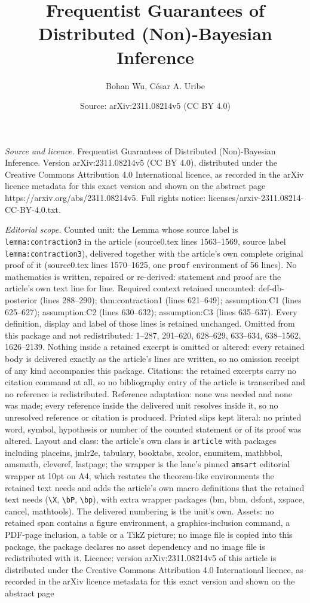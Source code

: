 \documentclass[10pt,a4paper]{amsart}
\title[Frequentist Guarantees of Distributed (Non)-Bayesian Inferen]{Frequentist Guarantees of Distributed (Non)-Bayesian Inference}
\author{Bohan Wu, C\'esar A. Uribe}
\date{Source: arXiv:2311.08214v5 (CC BY 4.0)}
\begin{document}
\maketitle

\noindent\emph{Source and licence.} Frequentist Guarantees of Distributed (Non)-Bayesian Inference. Version arXiv:2311.08214v5 (CC BY 4.0), distributed under the Creative Commons Attribution 4.0 International licence, as recorded in the arXiv licence metadata for this exact version and shown on the abstract page https://arxiv.org/abs/2311.08214v5. Full rights notice: licenses/arxiv-2311.08214-CC-BY-4.0.txt.\par\smallskip

\noindent\textit{Editorial scope.} Counted unit: the Lemma whose source label is \texttt{lemma:contraction3} in the article (source0.tex lines 1563--1569, source label \texttt{lemma:contraction3}), delivered together with the article's own complete original proof of it (source0.tex lines 1570--1625, one \texttt{proof} environment of 56 lines). No mathematics is written, repaired or re-derived: statement and proof are the article's own text line for line. Required context retained uncounted: def-db-posterior (lines 288--290); thm:contraction1 (lines 621--649); assumption:C1 (lines 625--627); assumption:C2 (lines 630--632); assumption:C3 (lines 635--637). Every definition, display and label of those lines is retained unchanged. Omitted from this package and not redistributed: 1--287, 291--620, 628--629, 633--634, 638--1562, 1626--2139. Nothing inside a retained excerpt is omitted or altered: every retained body is delivered exactly as the article's lines are written, so no omission receipt of any kind accompanies this package. Citations: the retained excerpts carry no citation command at all, so no bibliography entry of the article is transcribed and no reference is redistributed. Reference adaptation: none was needed and none was made; every reference inside the delivered unit resolves inside it, so no unresolved reference or citation is produced. Printed slips kept literal: no printed word, symbol, hypothesis or number of the counted statement or of its proof was altered. Layout and class: the article's own class is \texttt{article} with packages including placeins, jmlr2e, tabulary, booktabs, xcolor, enumitem, mathbbol, amsmath, cleveref, lastpage; the wrapper is the lane's pinned \texttt{amsart} editorial wrapper at 10pt on A4, which restates the theorem-like environments the retained text needs and adds the article's own macro definitions that the retained text needs (\texttt{\textbackslash X}, \texttt{\textbackslash bP}, \texttt{\textbackslash bp}), with extra wrapper packages (bm, bbm, dsfont, xspace, cancel, mathtools). The delivered numbering is the unit's own. Assets: no retained span contains a figure environment, a graphics-inclusion command, a PDF-page inclusion, a table or a TikZ picture; no image file is copied into this package, the package declares no asset dependency and no image file is redistributed with it. Licence: version arXiv:2311.08214v5 of this article is distributed under the Creative Commons Attribution 4.0 International licence, as recorded in the arXiv licence metadata for this exact version and shown on the abstract page 
\end{document}
